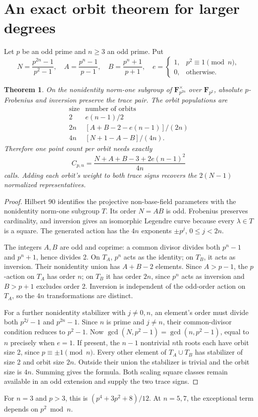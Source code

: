 \documentclass[11pt]{article}
\newtheorem{theorem}{Theorem}
\newcommand{\F}{\mathbf F}
\begin{document}
\section{An exact orbit theorem for larger degrees}
Let $p$ be an odd prime and $n\ge3$ an odd prime. Put
\[
 N=\frac{p^{2n}-1}{p^2-1},\quad
 A=\frac{p^n-1}{p-1},\quad
 B=\frac{p^n+1}{p+1},\quad
 e=\begin{cases}1,&p^2\equiv1\pmod n,\\0,&\text{otherwise}.\end{cases}
\]
\begin{theorem}
On the nonidentity norm-one subgroup of $\F_{p^{2n}}^\times$ over
$\F_{p^2}$, absolute $p$-Frobenius and inversion preserve the trace pair.
The orbit populations are
\[
 \begin{array}{c|c}
 \text{size}&\text{number of orbits}\\\hline
 2&e(n-1)/2\\
 2n&[A+B-2-e(n-1)]/(2n)\\
 4n&[N+1-A-B]/(4n).
 \end{array}
\]
Therefore one point count per orbit needs exactly
\[
 C_{p,n}=\frac{N+A+B-3+2e(n-1)^2}{4n}
\]
calls. Adding each orbit's weight to both trace signs recovers the
$2(N-1)$ normalized representatives.
\end{theorem}
\begin{proof}
Hilbert 90 identifies the projective non-base-field parameters with the
nonidentity norm-one subgroup $T$. Its order $N=AB$ is odd. Frobenius
preserves cardinality, and inversion gives an isomorphic Legendre curve
because every $\lambda\in T$ is a square. The generated action has the
$4n$ exponents $\pm p^j$, $0\le j<2n$.

The integers $A,B$ are odd and coprime: a common divisor divides both
$p^n-1$ and $p^n+1$, hence divides 2. On $T_A$, $p^n$ acts as the
identity; on $T_B$, it acts as inversion. Their nonidentity union has
$A+B-2$ elements.
Since $A>p-1$, the $p$-action on $T_A$ has order $n$; on $T_B$ it
has order $2n$, since $p^n$ acts as inversion and $B>p+1$ excludes
order 2. Inversion is independent of the odd-order action on $T_A$,
so the $4n$ transformations are distinct.


For a further nonidentity stabilizer with $j\ne0,n$, an element's order
must divide both $p^{2j}-1$ and $p^{2n}-1$. Since $n$ is prime and
$j\ne n$, their common-divisor condition reduces to $p^2-1$. Now
$\gcd(N,p^2-1)=\gcd(n,p^2-1)$, equal to $n$ precisely when $e=1$.
If present, the $n-1$ nontrivial $n$th roots each have orbit size 2,
since $p\equiv\pm1\pmod n$. Every other element of $T_A\cup T_B$
has stabilizer of size 2 and orbit size $2n$. Outside their union the
stabilizer is trivial and the orbit size is $4n$. Summing gives the
formula. Both scaling square classes remain available in an odd
extension and supply the two trace signs.
\end{proof}
For $n=3$ and $p>3$, this is $(p^4+3p^2+8)/12$. At $n=5,7$,
the exceptional term depends on $p^2\bmod n$.
\end{document}
